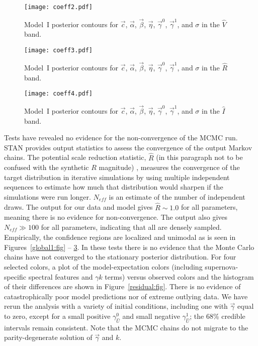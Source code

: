 \documentclass{aastex61}   	%
\begin{document}
\begin{figure}[htbp] %
   \centering
   \texttt{[image: coeff2.pdf]} 
            \caption{Model~I posterior contours for $\vec{c}$, $\vec{\alpha}$, $\vec{\beta}$, $\vec{\eta}$, $\vec{\gamma}^0$, $\vec{\gamma}^1$, and $\sigma$ in the ${\hat{V}}$ band.
 \label{global3:fig}}
\end{figure}

\begin{figure}[htbp] %
   \centering
      \texttt{[image: coeff3.pdf]} 
            \caption{Model~I posterior contours for  $\vec{c}$, $\vec{\alpha}$, $\vec{\beta}$, $\vec{\eta}$,  $\vec{\gamma}^0$, $\vec{\gamma}^1$, and $\sigma$ in the ${\hat{R}}$ band.
 \label{global4:fig}}
\end{figure}

\begin{figure}[htbp] %
   \centering
         \texttt{[image: coeff4.pdf]} 
            \caption{Model~I posterior contours for  $\vec{c}$, $\vec{\alpha}$, $\vec{\beta}$, $\vec{\eta}$, $\vec{\gamma}^0$, $\vec{\gamma}^1$, and $\sigma$ in the ${\hat{I}}$ band.
 \label{global5:fig}}
\end{figure}

Tests have revealed no evidence for the non-convergence of the MCMC run.
STAN provides output statistics to assess
the convergence of the output Markov chains.
The 
potential scale reduction statistic, $\hat{R}$
(in this paragraph not to be confused with the synthetic $R$ magnitude)
\citep{Gelman92}, measures the convergence of the target distribution
in iterative simulations 
by using multiple independent sequences to estimate how much that distribution would sharpen if the simulations were run longer.
$N_{\mathit{eff}}$ is an estimate of the number of independent draws. The output for our data and model gives $\hat{R} \sim 1.0$ for all parameters, meaning there is no evidence for non-convergence.  The
output also gives  $N_{\mathit{eff}} \gg 100$ for all parameters, indicating that all are densely sampled.
Empirically, the confidence regions are localized and unimodal as is seen in  Figures~\ref{global1:fig} -- \ref{global5:fig}.  In these tests there is no evidence that
the Monte Carlo chains have not converged to the stationary posterior distribution.
For four selected colors, a plot of the
\color{red}
model-expectation colors (including  supernova-specific spectral features and $\gamma k$ terms)
\color{black}
 versus observed colors and the histogram of their differences
are shown in Figure~\ref{residual:fig}. 
There is no evidence of catastrophically poor model predictions nor of extreme
outlying data.
We have rerun the analysis with a variety of initial conditions, including one with $\vec{\gamma}$ equal to zero, except for a small positive 
\color{red}
$\gamma^0_{\hat{U}}$ and small negative $\gamma^1_{\hat{U}}$;
\color{black}
the 68\% credible intervals
remain consistent.  Note that the MCMC chains do not migrate to the parity-degenerate solution of $\vec{\gamma}$ and $k$. 
\end{document}
